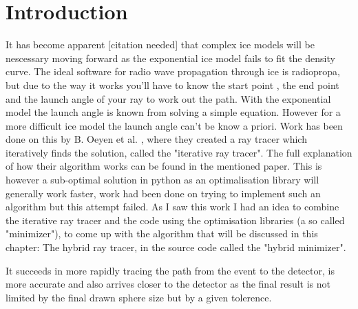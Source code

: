 \documentclass[11pt,a4paper,faculty=we,language=en,doctype=report]{cls/ugent-doc}
\begin{document}
\section{Introduction}
It has become apparent [citation needed] that complex ice models will be nescessary moving forward 
as the exponential ice model fails to fit the density curve. 
The ideal software for radio wave propagation through
ice is radiopropa\cite{Winchen_2019}, but due to the way it works you'll have
to know the start point , the end point and the launch angle of your ray to
work out the path. With the exponential model the launch angle is known from solving a simple 
equation.
However for a more difficult ice model the launch angle can't be know a priori.
Work has been done on this by B. Oeyen et al. \cite{2022icrc.confE1027O}, 
where they created a ray tracer which iteratively finds the solution, 
called the "iterative ray tracer".
The full explanation of how their algorithm works can be found in the mentioned paper. 
This is however a sub-optimal solution in python as an optimalisation library 
will generally work faster, work
had been done on trying to implement such an algorithm but this attempt failed.
As I saw this work I had an idea to combine the iterative ray tracer and the code using the 
optimisation libraries (a so called "minimizer"), to come up with the algorithm that will 
be discussed in this chapter: The hybrid ray tracer, in the source code called the "hybrid
minimizer".

It succeeds in more rapidly tracing the path from the event
to the detector, is more accurate and also arrives closer to the detector as the final result is
not limited by the final drawn sphere size but by a given tolerence.
\end{document}
